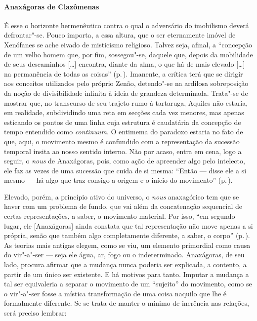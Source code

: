 \paragraph{Anaxágoras de Clazômenas} É esse o horizonte hermenêutico contra o
 qual o adversário do imobilismo deverá defrontar"-se. Pouco importa, a essa
 altura, que o ser eternamente imóvel de Xenófanes se ache eivado de
 misticismo religioso. Talvez seja, afinal, a ``concepção de um velho homem
 que, por fim, sossegou"-se, daquele que, depois da mobilidade de seus
 descaminhos [\ldots] encontra, diante da alma, o que há de mais elevado
 [\ldots] na permanência de todas as coisas'' (p.\,\pageref{velhohomem}). 
 Imanente, a crítica terá que se dirigir aos conceitos
 utilizados pelo próprio Zenão, detendo"-se na ardilosa sobreposição da noção
 de divisibilidade infinita à ideia de grandeza determinada. Trata"-se de
 mostrar que, no transcurso de seu trajeto rumo à tartaruga, Aquiles não
 estaria, em realidade, subdividindo uma reta em secções cada vez menores,
 mas apenas esticando os pontos de uma linha cuja estrutura é caudatária da
 concepção de tempo entendido como
\textit{continuum}. O entimema do paradoxo estaria no fato de que, aqui, o
 movimento mesmo é confundido com a representação da sucessão temporal ínsita
 ao nosso sentido interno. Não por acaso, entra em cena, logo a seguir,
 o \textit{nous} de Anaxágoras, pois, como ação de apreender algo pelo
 intelecto, ele faz as vezes de uma sucessão que cuida de si mesma:
 ``Então --- disse ele a si mesmo --- há algo que traz consigo a origem e o
 início do movimento'' (p.\,\pageref{aorigemeoinicio}).

Elevado, porém, a princípio ativo do universo, o \textit{nous} anaxagórico tem
que se haver com um problema de fundo, que vai além da concatenação
sequencial de certas representações, a saber, o movimento material. Por isso,
``em segundo lugar, ele [Anaxágoras] ainda constata que tal representação não
move apenas a si própria, senão que também algo completamente diferente, a
saber, o corpo'' (p.\,\pageref{asipropria}). As teorias mais antigas elegem,
como se viu, um elemento primordial como causa do vir"-a"-ser --- seja ele
água, ar, fogo ou o indeterminado. Anaxágoras, de seu lado, procura afirmar
que a mudança nunca poderia ser explicada, a contento, a partir de um único
ser existente. E há motivos para tanto. Imputar a mudança a tal ser
equivaleria a separar o movimento de um ``sujeito'' do movimento, como se o
vir"-a"-ser fosse a mística transformação de uma coisa naquilo que lhe é
formalmente diferente. Se se trata de manter o mínimo de inerência nas
relações, será preciso lembrar: 

